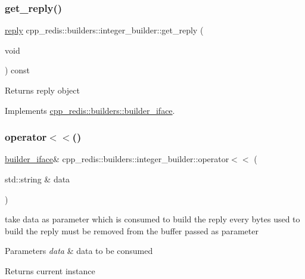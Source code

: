 \subsubsection{\texorpdfstring{get\+\_\+reply()}{get\_reply()}}
{\footnotesize\ttfamily \mbox{\hyperlink{classcpp__redis_1_1reply}{reply}} cpp\+\_\+redis\+::builders\+::integer\+\_\+builder\+::get\+\_\+reply (\begin{DoxyParamCaption}\item[{void}]{ }\end{DoxyParamCaption}) const\hspace{0.3cm}{\ttfamily [virtual]}}

\begin{DoxyReturn}{Returns}
reply object 
\end{DoxyReturn}


Implements \mbox{\hyperlink{classcpp__redis_1_1builders_1_1builder__iface_afd2ff2c2371c2a486116543b638b9413}{cpp\+\_\+redis\+::builders\+::builder\+\_\+iface}}.

\mbox{\label{classcpp__redis_1_1builders_1_1integer__builder_ae29f074134f7269db7f947b0fcbe312e}} 
\subsubsection{\texorpdfstring{operator$<$$<$()}{operator<<()}}
{\footnotesize\ttfamily \mbox{\hyperlink{classcpp__redis_1_1builders_1_1builder__iface}{builder\+\_\+iface}}\& cpp\+\_\+redis\+::builders\+::integer\+\_\+builder\+::operator$<$$<$ (\begin{DoxyParamCaption}\item[{std\+::string \&}]{data }\end{DoxyParamCaption})\hspace{0.3cm}{\ttfamily [virtual]}}

take data as parameter which is consumed to build the reply every bytes used to build the reply must be removed from the buffer passed as parameter


\begin{DoxyParams}{Parameters}
{\em data} & data to be consumed \\
\hline
\end{DoxyParams}
\begin{DoxyReturn}{Returns}
current instance 
\end{DoxyReturn}


